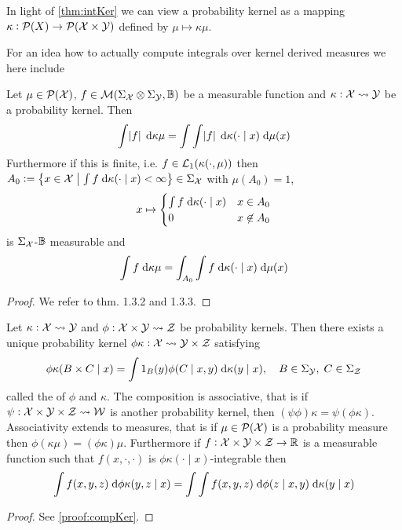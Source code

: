 \begin{rem}
  In light of \cref{thm:intKer} we can view a probability kernel as a mapping
  $\kappa : \mathcal{P}(X) \to \mathcal{P}(\mathcal{X} \times \mathcal{Y})$
  defined by $\mu \mapsto \kappa \mu$.
  \label{rem:measureMap}
\end{rem}

For an idea how to actually compute integrals over kernel derived measures
we here include
\begin{thm}
  Let $\mu \in \mathcal{P}(\mathcal{X})$,
  $f \in \mathcal{M}(\Sigma_\mathcal{X} \otimes \Sigma_\mathcal{Y}, \mathbb{B})$
  be a measurable function and
  $\kappa : \mathcal{X} \leadsto \mathcal{Y}$ be a probability kernel.
  Then
  \[ \int \abs{f} \; \mathrm{d} \kappa \mu
  = \int \int \abs{f} \; \mathrm{d} \kappa(\cdot \mid x) \; \mathrm{d} \mu(x) \]
  Furthermore if this is finite, i.e. $f \in \mathcal{L}_1(\kappa(\cdot, \mu))$
  then $A_0 \vcentcolon= \left\{ x \in \mathcal{X} \;\middle\vert\;
    \int f \; \mathrm{d} \kappa(\cdot \mid x) < \infty \right\}
  \in \Sigma_\mathcal{X}$
  with $\mu(A_0) = 1$, 
  \[ x \mapsto \begin{cases}
      \int f \; \mathrm{d} \kappa(\cdot \mid x) & x \in A_0
      \\ 0 & x \not\in A_0
  \end{cases} \]
  is $\Sigma_\mathcal{X}$-$\mathbb{B}$ measurable and
  \[ \int f \; \mathrm{d} \kappa \mu
  = \int_{A_0} \int f \; \mathrm{d} \kappa(\cdot \mid x) \; \mathrm{d} \mu(x) \]  
  \label{thm:extTonFub}
\end{thm}
\begin{proof}
  We refer to  thm. 1.3.2 and 1.3.3.
\end{proof}

\begin{prop}
  Let $\kappa : \mathcal{X} \leadsto \mathcal{Y}$ and
  $\phi : \mathcal{X} \times \mathcal{Y} \leadsto \mathcal{Z}$ be probability kernels.
  Then there exists a unique probability kernel
  $\phi \kappa: \mathcal{X} \leadsto \mathcal{Y} \times \mathcal{Z}$
  satisfying
  \[ \phi \kappa(B \times C \mid x) = \int 1_B(y) \phi(C \mid x, y)
  \; \mathrm{d} \kappa(y \mid x), \quad B \in \Sigma_\mathcal{Y}, \; C \in \Sigma_\mathcal{Z} \]
  called the  of $\phi$ and $\kappa$.
  The composition is associative,
  that is if $\psi : \mathcal{X} \times \mathcal{Y} \times \mathcal{Z}
  \leadsto \mathcal{W}$
  is another probability kernel, then
  $(\psi \phi) \kappa = \psi (\phi \kappa)$.
  Associativity extends to measures, that is if
  $\mu \in \mathcal{P}(\mathcal{X})$ is a probability measure then
  $\phi (\kappa \mu) = (\phi \kappa) \mu$.
  Furthermore if $f : \mathcal{X} \times \mathcal{Y} \times \mathcal{Z} \to \mathbb{R}$ is
  a measurable function such that $f(x, \cdot, \cdot)$ is
  $\phi \kappa( \cdot \mid x )$-integrable then
  \[ \int f(x, y, z) \; \mathrm{d} \phi \kappa (y, z \mid x)
  = \int \int f(x, y, z) \; \mathrm{d} \phi(z \mid x, y) \; \mathrm{d} \kappa(y \mid x) \]
  \label{prop:compKer}
\end{prop}
\begin{proof}
  See \cref{proof:compKer}.
\end{proof}

